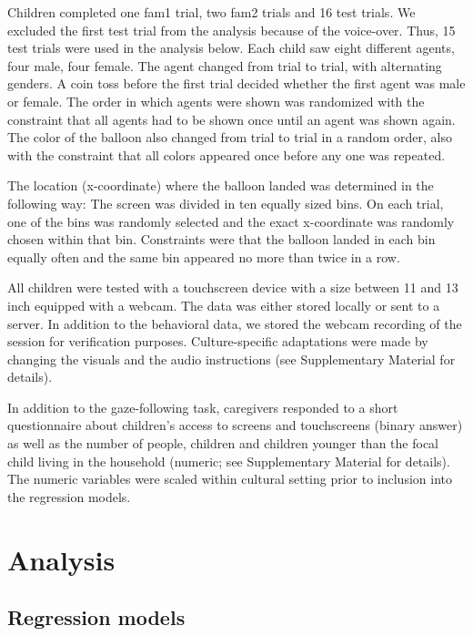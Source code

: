 \documentclass[
  man,floatsintext]{apa6}
\begin{document}
Children completed one fam1 trial, two fam2 trials and 16 test trials. We excluded the first test trial from the analysis because of the voice-over. Thus, 15 test trials were used in the analysis below. Each child saw eight different agents, four male, four female. The agent changed from trial to trial, with alternating genders. A coin toss before the first trial decided whether the first agent was male or female. The order in which agents were shown was randomized with the constraint that all agents had to be shown once until an agent was shown again. The color of the balloon also changed from trial to trial in a random order, also with the constraint that all colors appeared once before any one was repeated.

The location (x-coordinate) where the balloon landed was determined in the following way: The screen was divided in ten equally sized bins. On each trial, one of the bins was randomly selected and the exact x-coordinate was randomly chosen within that bin. Constraints were that the balloon landed in each bin equally often and the same bin appeared no more than twice in a row.

All children were tested with a touchscreen device with a size between 11 and 13 inch equipped with a webcam. The data was either stored locally or sent to a server. In addition to the behavioral data, we stored the webcam recording of the session for verification purposes. Culture-specific adaptations were made by changing the visuals and the audio instructions (see Supplementary Material for details).

In addition to the gaze-following task, caregivers responded to a short questionnaire about children's access to screens and touchscreens (binary answer) as well as the number of people, children and children younger than the focal child living in the household (numeric; see Supplementary Material for details). The numeric variables were scaled within cultural setting prior to inclusion into the regression models.

\hypertarget{analysis}{%
\section{Analysis}\label{analysis}}

\hypertarget{regression-models}{%
\subsection{Regression models}\label{regression-models}}
\end{document}
